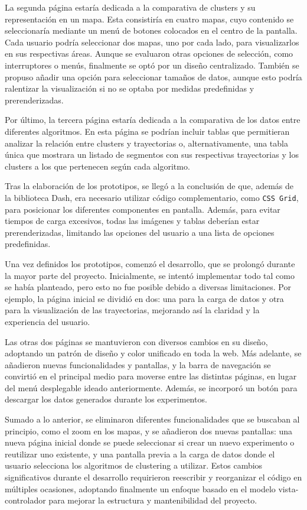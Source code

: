 La segunda página estaría dedicada a la comparativa de clusters y su representación en un mapa. Esta consistiría en cuatro mapas, cuyo contenido se seleccionaría mediante un menú de botones colocados en el centro de la pantalla. Cada usuario podría seleccionar dos mapas, uno por cada lado, para visualizarlos en sus respectivas áreas. Aunque se evaluaron otras opciones de selección, como interruptores o menús, finalmente se optó por un diseño centralizado. También se propuso añadir una opción para seleccionar tamaños de datos, aunque esto podría ralentizar la visualización si no se optaba por medidas predefinidas y prerenderizadas.

Por último, la tercera página estaría dedicada a la comparativa de los datos entre diferentes algoritmos. En esta página se podrían incluir tablas que permitieran analizar la relación entre clusters y trayectorias o, alternativamente, una tabla única que mostrara un listado de segmentos con sus respectivas trayectorias y los clusters a los que pertenecen según cada algoritmo.

Tras la elaboración de los prototipos, se llegó a la conclusión de que, además de la biblioteca Dash, era necesario utilizar código complementario, como \texttt{CSS Grid}, para posicionar los diferentes componentes en pantalla. Además, para evitar tiempos de carga excesivos, todas las imágenes y tablas deberían estar prerenderizadas, limitando las opciones del usuario a una lista de opciones predefinidas.

Una vez definidos los prototipos, comenzó el desarrollo, que se prolongó durante la mayor parte del proyecto. Inicialmente, se intentó implementar todo tal como se había planteado, pero esto no fue posible debido a diversas limitaciones. Por ejemplo, la página inicial se dividió en dos: una para la carga de datos y otra para la visualización de las trayectorias, mejorando así la claridad y la experiencia del usuario.

Las otras dos páginas se mantuvieron con diversos cambios en su diseño, adoptando un patrón de diseño y color unificado en toda la web. Más adelante, se añadieron nuevas funcionalidades y pantallas, y la barra de navegación se convirtió en el principal medio para moverse entre las distintas páginas, en lugar del menú desplegable ideado anteriormente. Además, se incorporó un botón para descargar los datos generados durante los experimentos.

Sumado a lo anterior, se eliminaron diferentes funcionalidades que se buscaban al principio, como el zoom en los mapas, y se añadieron dos nuevas pantallas: una nueva página inicial donde se puede seleccionar si crear un nuevo experimento o reutilizar uno existente, y una pantalla previa a la carga de datos donde el usuario selecciona los algoritmos de clustering a utilizar. Estos cambios significativos durante el desarrollo requirieron reescribir y reorganizar el código en múltiples ocasiones, adoptando finalmente un enfoque basado en el modelo vista-controlador para mejorar la estructura y mantenibilidad del proyecto.


